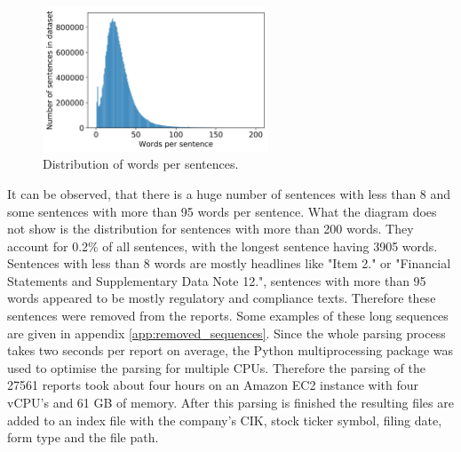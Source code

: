 \begin{figure}[h]
    \centering
    \includegraphics[width=0.6\textwidth]{figures/charts/words_distribution.png}
    \caption{Distribution of words per sentences.}
    \label{figure:words_distribution}
\end{figure}
It can be observed, that there is a huge number of sentences with less than 8 and some sentences with more than 95 words per sentence.
What the diagram does not show is the distribution for sentences with more than 200 words.
They account for 0.2\% of all sentences, with the longest sentence having 3905 words.
Sentences with less than 8 words are mostly headlines like "Item 2." or "Financial Statements and Supplementary Data Note 12.", sentences with more than 95 words appeared to be mostly regulatory and compliance texts.
Therefore these sentences were removed from the reports.
Some examples of these long sequences are given in appendix \ref{app:removed_sequences}.
Since the whole parsing process takes two seconds per report on average, the Python multiprocessing package was used to optimise the parsing for multiple \acs{CPU}s.
Therefore the parsing of the 27561 reports took about four hours on an Amazon EC2 instance with four v\acs{CPU}'s and 61 GB of memory.
After this parsing is finished the resulting files are added to an index file with the company's \ac{CIK}, stock ticker symbol, filing date, form type and the file path.

